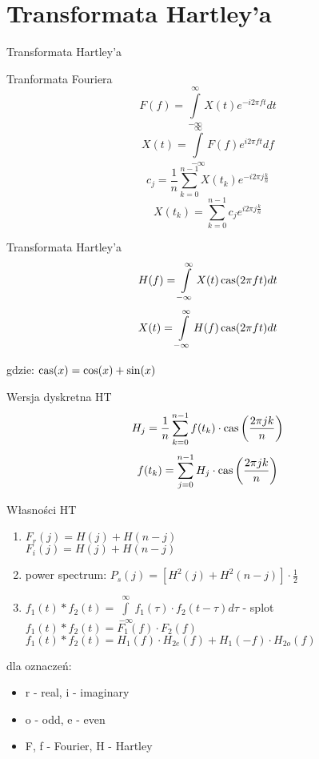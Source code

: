 \section{Transformata Hartley'a}
\begin{frame}[allowframebreaks]{Transformata Hartley'a}
	\begin{block}{Tranformata Fouriera}
	\[
		F(f) = \int\limits_{-\infty}^{\infty} X(t) e^{-i2\pi ft} dt
	\]
	\[
		X(t) = \int\limits_{-\infty}^{\infty} F(f) e^{i2\pi ft} df
	\]
	\[
		c_j = \frac{1}{n} \sum\limits_{k = 0}^{n-1} X(t_k) e^{-i2\pi j \frac{k}{n}}
	\]
	\[
		X(t_k) = \sum\limits_{k = 0}^{n-1} c_j e^{i2\pi j \frac{k}{n}}
	\]
	\end{block}
	\begin{block}{Transformata Hartley'a}
	\[
		H(f) = \int\limits_{-\infty}^{\infty} X(t) \operatorname{cas}(2\pi ft) dt
	\]
	\[
	X(t) = \int\limits_{-\infty}^{\infty} H(f) \operatorname{cas}(2\pi ft) dt
	\]
	\end{block}
	gdzie: $\operatorname{cas}(x) = \cos(x) + \sin(x)$
	\begin{block}{Wersja dyskretna HT}
	\[
		H_j = \frac{1}{n} \sum\limits_{k = 0}^{n-1} f(t_k) \cdot \operatorname{cas} \bigg( \frac{2\pi jk}{n} \bigg)
	\]
	\[
		f(t_k) = \sum\limits_{j=0}^{n-1} H_j \cdot \operatorname{cas} \bigg( \frac{2\pi jk}{n} \bigg)
	\]
	\end{block}
\end{frame}
\begin{frame}{Własności HT}
	\begin{block}{16.30}
		\centering
		\begin{enumerate}[1$^\circ$]
			\item $F_r(j) = H(j) + H(n-j)$ \\ $F_i(j) = H(j) + H(n-j)$ \\
			\item power spectrum: $P_s(j) = [H^2(j) + H^2(n-j)] \cdot \frac{1}{2}$ \\
			\item $f_1(t) \ast f_2(t) = \int\limits_{-\infty}^{\infty} f_1(\tau) \cdot f_2(t - \tau) d\tau$ \hfill - splot \\
			$f_1(t) \ast f_2(t) = F_1(f) \cdot F_2(f)$ \\
			$f_1(t) \ast f_2(t) = H_1(f) \cdot H_{2e}(f) + H_1(-f) \cdot H_{2o}(f)$
		\end{enumerate}
	\end{block}
	dla oznaczeń:
	\begin{itemize}
		\item r - real, i - imaginary \\
		\item o - odd, e - even \\
		\item F, f - Fourier, H - Hartley
	\end{itemize}
\end{frame}
